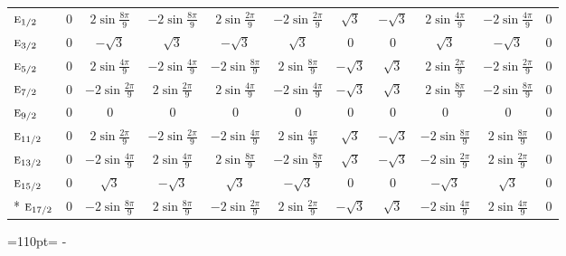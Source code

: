 \documentclass[10pt,a4paper]{article}
\makeatletter
\def\grouprule#1#2{\noalign{\marks\LTgroupmarks{\the\belowrulesep}\nobreak\vskip#1%
  \vskip\aboverulesep}\multispan\LT@cols\unskip{\leaders\hrule\@height#2\hfill\kern\z@}\cr
  \noalign{\penalty\LTrulebreak\vskip\belowrulesep\global\@lastruleclass\z@}}
\newcommand{\needspace}[1]{\par\penalty-100\begingroup\dimen0=#1\relax\dimen2=\pagegoal
  \advance\dimen2-\pagetotal\ifdim\dimen0>\dimen2\relax\ifdim\dimen2>0pt\vfil\break\fi\fi
  \endgroup}
\numberwithin{equation}{section}
\newcommand{\irr}[1]{\text{\normalfont\scshape #1}}
\makeatother
\begin{document}
{{\begin{longtable}{@{}lcccccccccc@{}}
\grouprule{0pt}{\lightrulewidth}
$\irr{e}_{1/2}$ & $0$ & $2\sin\tfrac{8\pi}{9}$ & $-2\sin\tfrac{8\pi}{9}$ & $2\sin\tfrac{2\pi}{9}$ & $-2\sin\tfrac{2\pi}{9}$ & $\sqrt{3}$ & $-\sqrt{3}$ & $2\sin\tfrac{4\pi}{9}$ & $-2\sin\tfrac{4\pi}{9}$ & $0$\\
$\irr{e}_{3/2}$ & $0$ & $-\sqrt{3}$ & $\sqrt{3}$ & $-\sqrt{3}$ & $\sqrt{3}$ & $0$ & $0$ & $\sqrt{3}$ & $-\sqrt{3}$ & $0$\\
$\irr{e}_{5/2}$ & $0$ & $2\sin\tfrac{4\pi}{9}$ & $-2\sin\tfrac{4\pi}{9}$ & $-2\sin\tfrac{8\pi}{9}$ & $2\sin\tfrac{8\pi}{9}$ & $-\sqrt{3}$ & $\sqrt{3}$ & $2\sin\tfrac{2\pi}{9}$ & $-2\sin\tfrac{2\pi}{9}$ & $0$\\
$\irr{e}_{7/2}$ & $0$ & $-2\sin\tfrac{2\pi}{9}$ & $2\sin\tfrac{2\pi}{9}$ & $2\sin\tfrac{4\pi}{9}$ & $-2\sin\tfrac{4\pi}{9}$ & $-\sqrt{3}$ & $\sqrt{3}$ & $2\sin\tfrac{8\pi}{9}$ & $-2\sin\tfrac{8\pi}{9}$ & $0$\\
$\irr{e}_{9/2}$ & $0$ & $0$ & $0$ & $0$ & $0$ & $0$ & $0$ & $0$ & $0$ & $0$\\
$\irr{e}_{11/2}$ & $0$ & $2\sin\tfrac{2\pi}{9}$ & $-2\sin\tfrac{2\pi}{9}$ & $-2\sin\tfrac{4\pi}{9}$ & $2\sin\tfrac{4\pi}{9}$ & $\sqrt{3}$ & $-\sqrt{3}$ & $-2\sin\tfrac{8\pi}{9}$ & $2\sin\tfrac{8\pi}{9}$ & $0$\\
$\irr{e}_{13/2}$ & $0$ & $-2\sin\tfrac{4\pi}{9}$ & $2\sin\tfrac{4\pi}{9}$ & $2\sin\tfrac{8\pi}{9}$ & $-2\sin\tfrac{8\pi}{9}$ & $\sqrt{3}$ & $-\sqrt{3}$ & $-2\sin\tfrac{2\pi}{9}$ & $2\sin\tfrac{2\pi}{9}$ & $0$\\
$\irr{e}_{15/2}$ & $0$ & $\sqrt{3}$ & $-\sqrt{3}$ & $\sqrt{3}$ & $-\sqrt{3}$ & $0$ & $0$ & $-\sqrt{3}$ & $\sqrt{3}$ & $0$\\*
$\irr{e}_{17/2}$ & $0$ & $-2\sin\tfrac{8\pi}{9}$ & $2\sin\tfrac{8\pi}{9}$ & $-2\sin\tfrac{2\pi}{9}$ & $2\sin\tfrac{2\pi}{9}$ & $-\sqrt{3}$ & $\sqrt{3}$ & $-2\sin\tfrac{4\pi}{9}$ & $2\sin\tfrac{4\pi}{9}$ & $0$\\
\bottomrule\end{longtable}}}
\needspace{110pt}
\end{document}
